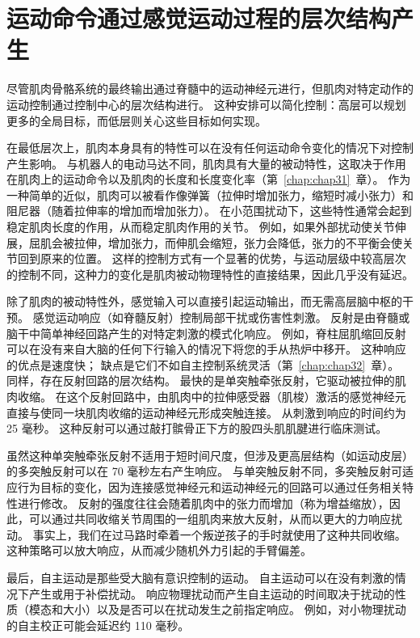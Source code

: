 \section{运动命令通过感觉运动过程的层次结构产生}

尽管肌肉骨骼系统的最终输出通过脊髓中的运动神经元进行，但肌肉对特定动作的运动控制通过控制中心的层次结构进行。
这种安排可以简化控制：高层可以规划更多的全局目标，而低层则关心这些目标如何实现。


在最低层次上，肌肉本身具有的特性可以在没有任何运动命令变化的情况下对控制产生影响。
与机器人的电动马达不同，肌肉具有大量的被动特性，这取决于作用在肌肉上的运动命令以及肌肉的长度和长度变化率（第~\ref{chap:chap31}~章）。
作为一种简单的近似，肌肉可以被看作像弹簧（拉伸时增加张力，缩短时减小张力）和阻尼器（随着拉伸率的增加而增加张力）。
在小范围扰动下，这些特性通常会起到稳定肌肉长度的作用，从而稳定肌肉作用的关节。
例如，如果外部扰动使关节伸展，屈肌会被拉伸，增加张力，而伸肌会缩短，张力会降低，张力的不平衡会使关节回到原来的位置。
这样的控制方式有一个显著的优势，与运动层级中较高层次的控制不同，这种力的变化是肌肉被动物理特性的直接结果，因此几乎没有延迟。


除了肌肉的被动特性外，感觉输入可以直接引起运动输出，而无需高层脑中枢的干预。
感觉运动响应（如脊髓反射）控制局部干扰或伤害性刺激。
反射是由脊髓或脑干中简单神经回路产生的对特定刺激的模式化响应。
例如，脊柱屈肌缩回反射可以在没有来自大脑的任何下行输入的情况下将您的手从热炉中移开。
这种响应的优点是速度快；
缺点是它们不如自主控制系统灵活（第~\ref{chap:chap32}~章）。
同样，存在反射回路的层次结构。
最快的是单突触牵张反射，它驱动被拉伸的肌肉收缩。 
在这个反射回路中，由肌肉中的拉伸感受器（肌梭）激活的感觉神经元直接与使同一块肌肉收缩的运动神经元形成突触连接。
从刺激到响应的时间约为 25 毫秒。
这种反射可以通过敲打髌骨正下方的股四头肌肌腱进行临床测试。


虽然这种单突触牵张反射不适用于短时间尺度，但涉及更高层结构（如运动皮层）的多突触反射可以在 70 毫秒左右产生响应。
与单突触反射不同，多突触反射可适应行为目标的变化，因为连接感觉神经元和运动神经元的回路可以通过任务相关特性进行修改。
反射的强度往往会随着肌肉中的张力而增加（称为增益缩放），因此，可以通过共同收缩关节周围的一组肌肉来放大反射，从而以更大的力响应扰动。
事实上，我们在过马路时牵着一个叛逆孩子的手时就使用了这种共同收缩。
这种策略可以放大响应，从而减少随机外力引起的手臂偏差。


最后，自主运动是那些受大脑有意识控制的运动。
自主运动可以在没有刺激的情况下产生或用于补偿扰动。
响应物理扰动而产生自主运动的时间取决于扰动的性质（模态和大小）以及是否可以在扰动发生之前指定响应。
例如，对小物理扰动的自主校正可能会延迟约 110 毫秒。


